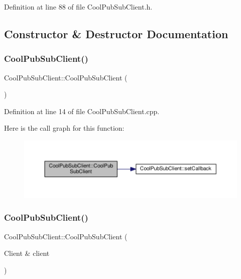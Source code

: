 Definition at line 88 of file Cool\+Pub\+Sub\+Client.\+h.



\subsection{Constructor \& Destructor Documentation}
\mbox{\label{class_cool_pub_sub_client_a2e54e36217bb0969b91b5dee9a27410f}} 
\subsubsection{\texorpdfstring{Cool\+Pub\+Sub\+Client()}{CoolPubSubClient()}\hspace{0.1cm}{\footnotesize\ttfamily [1/14]}}
{\footnotesize\ttfamily Cool\+Pub\+Sub\+Client\+::\+Cool\+Pub\+Sub\+Client (\begin{DoxyParamCaption}{ }\end{DoxyParamCaption})}



Definition at line 14 of file Cool\+Pub\+Sub\+Client.\+cpp.

Here is the call graph for this function\+:
\nopagebreak
\begin{figure}[H]
\begin{center}
\leavevmode
\includegraphics[width=350pt]{class_cool_pub_sub_client_a2e54e36217bb0969b91b5dee9a27410f_cgraph}
\end{center}
\end{figure}
\mbox{\label{class_cool_pub_sub_client_a0563a12cb4e9339bf2605cfc655e717d}} 
\subsubsection{\texorpdfstring{Cool\+Pub\+Sub\+Client()}{CoolPubSubClient()}\hspace{0.1cm}{\footnotesize\ttfamily [2/14]}}
{\footnotesize\ttfamily Cool\+Pub\+Sub\+Client\+::\+Cool\+Pub\+Sub\+Client (\begin{DoxyParamCaption}\item[{Client \&}]{client }\end{DoxyParamCaption})}



